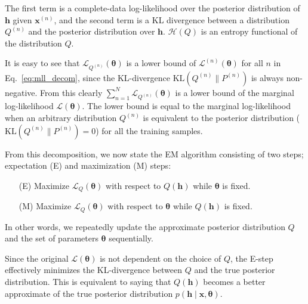\documentclass[dissertation,nocontribution,draft*]{aaltoseries}
\newcommand{\vect}[1]{\mathbf{#1}}
\newcommand{\vects}[1]{\boldsymbol{#1}}
\newcommand{\vh}[0]{\vect{h}}
\newcommand{\vx}[0]{\vect{x}}
\newcommand{\TT}[0]{{\vects{\theta}}}
\newcommand{\LL}[0]{\mathcal{L}}
\newcommand{\HH}[0]{\mathcal{H}}
\newcommand{\KL}[0]{\text{KL}}
\begin{document}
The first term is a complete-data log-likelihood over the
posterior distribution of $\vh$ given $\vx^{(n)}$, and the
second term is a KL divergence between a distribution
$Q^{(n)}$ and the posterior distribution over $\vh$.
$\HH(Q)$ is an entropy functional of the distribution $Q$.

It is easy to see that $\LL_{Q^{(n)}}(\TT)$ is a lower bound
of $\LL^{(n)}(\TT)$ for all $n$ in Eq.~\eqref{eq:mll_decom},
since the KL-divergence $\KL(Q^{(n)}\| P^{(n)})$ is always
non-negative. From this clearly $\sum_{n=1}^N
\LL_{Q^{(n)}}(\TT)$ is a lower bound of the marginal
log-likelihood $\LL(\TT)$. The lower bound is
equal to the marginal log-likelihood when an arbitrary
distribution $Q^{(n)}$ is equivalent to the posterior distribution
($\KL(Q^{(n)} \| P^{(n)}) = 0$) for all the training
samples.

From this decomposition, we now state the EM algorithm
consisting of two steps; expectation (E) and maximization
(M) steps:
\begin{enumerate}
    \itemsep 0em
    \item[(E)] Maximize $\LL_Q(\TT)$ with respect to $Q(\vh)$
        while $\TT$ is fixed.
    \item[(M)] Maximize $\LL_Q(\TT)$ with respect to $\TT$
        while $Q(\vh)$ is fixed.
\end{enumerate}
In other words, we repeatedly update the approximate
posterior distribution $Q$ and the set of parameters $\TT$
sequentially. 

Since the original $\LL(\TT)$ is not dependent on the choice
of $Q$, the E-step effectively minimizes the KL-divergence
between $Q$ and the true posterior distribution. This is
equivalent to saying that $Q(\vh)$ becomes a better
approximate of the true posterior distribution
$p(\vh\mid\vx,\TT)$.
\end{document}
